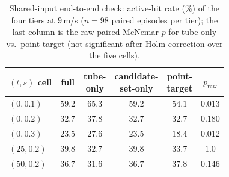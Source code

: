 \begin{table}[t]
\centering
\caption{Shared-input end-to-end check: active-hit rate (\%) of the four
tiers at $9$\,{\upshape m/s} ($n{=}98$ paired episodes per tier); the last
column is the raw paired McNemar $p$ for tube-only vs.\ point-target (not
significant after Holm correction over the five cells).}
\label{tab:shared}
\setlength{\tabcolsep}{2.5pt}
\begin{tabular}{@{}lccccc@{}}
\toprule
$(t,s)$ cell & full & \shortstack{tube-\\only} & \shortstack{candidate-\\set-only} & \shortstack{point-\\target} & $p_{\mathrm{raw}}$ \\
\midrule
$(0,0.1)$ & $59.2$ & $65.3$ & $59.2$ & $54.1$ & $0.013$ \\
$(0,0.2)$ & $32.7$ & $37.8$ & $32.7$ & $32.7$ & $0.180$ \\
$(0,0.3)$ & $23.5$ & $27.6$ & $23.5$ & $18.4$ & $0.012$ \\
$(25,0.2)$ & $39.8$ & $32.7$ & $39.8$ & $33.7$ & $1.0$ \\
$(50,0.2)$ & $36.7$ & $31.6$ & $36.7$ & $37.8$ & $0.146$ \\
\bottomrule
\end{tabular}
\end{table}

